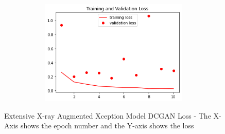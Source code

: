  \begin{figure}[H]
    \centering
    \includegraphics[width=1\textwidth,height=5cm,keepaspectratio]{Images/XceptionBaselineTrainingValidationLossExtensiveXray.png}\\
    \caption{Extensive X-ray Augmented Xception Model DCGAN Loss - The X-Axis shows the epoch number and the Y-axis shows the loss}
    \label{fig:Extensive X-ray Augmented Xception Model DCGAN Loss}
\end{figure}
